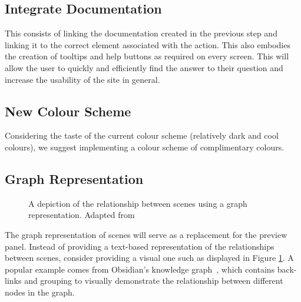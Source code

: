 \documentclass[sigart]{acmart_mod} %
\begin{document}
\subsection{Integrate Documentation}
This consists of linking the documentation created in the previous step and linking it to the correct element associated with the action. This also embodies the creation of tooltips and help buttons as required on every screen. This will allow the user to quickly and efficiently find the answer to their question and increase the usability of the site in general.

\subsection{New Colour Scheme}
Considering the taste of the current colour scheme (relatively dark and cool colours), we suggest implementing a colour scheme of complimentary colours.

\subsection{Graph Representation}
\begin{figure}
\caption{A depiction of the relationship between scenes using a graph representation. Adapted from~\cite{tAnswerDrawGraph2015}}\label{fig:scene_graph}
\end{figure}
The graph representation of scenes will serve as a replacement for the preview panel. Instead of providing a text-based representation of the relationships between scenes, consider providing a visual one such as displayed in Figure \ref{fig:scene_graph}. A popular example comes from Obsidian's knowledge graph~\cite{ObsidianSharpenYour}, which contains back-links and grouping to visually demonstrate the relationship between different nodes in the graph.
\end{document}
